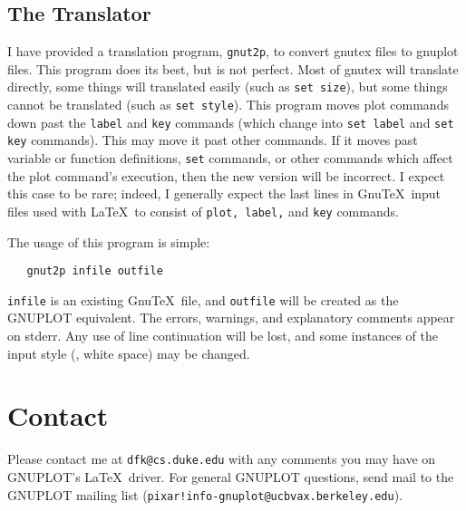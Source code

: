 \subsection{The Translator}
I have provided a translation program, {\tt gnut2p}, to convert gnutex
files to gnuplot files.  This program does its best, but is not
perfect. Most of gnutex will translate directly, some things will
translated easily (such as {\tt set size}), but some things cannot be
translated (such as {\tt set style}).  This program moves plot
commands down past the {\tt label} and {\tt key} commands (which
change into {\tt set label} and {\tt set key} commands). This may move
it past other commands. If it moves past variable or function
definitions, {\tt set} commands, or other commands which affect the
plot command's execution, then the new version will be incorrect. I
expect this case to be rare; indeed, I generally expect the last lines
in Gnu\TeX\ input files used with \LaTeX\ to consist of {\tt plot,
label,} and {\tt key} commands.

The usage of this program is simple: 
\begin{verbatim}
   gnut2p infile outfile
\end{verbatim}
{\tt infile} is an existing Gnu\TeX\ file, and {\tt outfile} will be
created as the GNUPLOT equivalent. The errors, warnings, and
explanatory comments appear on stderr. Any use of line continuation
will be lost, and some instances of the input style (\eg, white space)
may be changed.

\section{Contact}
Please contact me at \verb+dfk@cs.duke.edu+ with any comments you may
have on GNUPLOT's \LaTeX\ driver. For general GNUPLOT questions, send
mail to the GNUPLOT mailing list
(\verb+pixar!info-gnuplot@ucbvax.berkeley.edu+). 



